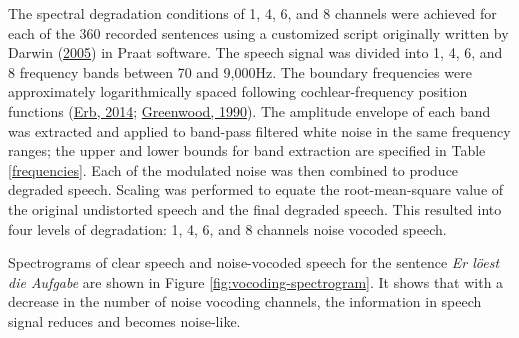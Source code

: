 \documentclass[a4paper, nobind]{templates/ociamthesis}
\begin{document}
The spectral degradation conditions of 1, 4, 6, and 8 channels were achieved for each of the 360 recorded sentences using a customized script originally written by Darwin (\protect\hyperlink{ref-Darwin2005}{2005}) in Praat software.
The speech signal was divided into 1, 4, 6, and 8 frequency bands between 70 and 9,000Hz.
The boundary frequencies were approximately logarithmically spaced following cochlear-frequency position functions (\protect\hyperlink{ref-Erb2014}{Erb, 2014}; \protect\hyperlink{ref-Greenwood1990}{Greenwood, 1990}).
The amplitude envelope of each band was extracted and applied to band-pass filtered white noise in the same frequency ranges;
the upper and lower bounds for band extraction are specified in Table \ref{frequencies}.
Each of the modulated noise was then combined to produce degraded speech.
Scaling was performed to equate the root-mean-square value of the original undistorted speech and the final degraded speech.
This resulted into four levels of degradation: 1, 4, 6, and 8 channels noise vocoded speech.

Spectrograms of clear speech and noise-vocoded speech for the sentence \emph{Er löest die Aufgabe} are shown in Figure \ref{fig:vocoding-spectrogram}. It shows that with a decrease in the number of noise vocoding channels, the information in speech signal reduces and becomes noise-like.
\end{document}
